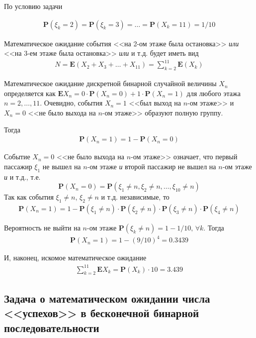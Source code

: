\documentclass[%
	11pt,
	a4paper,
	utf8,
		]{article}
\begin{document}
По условию задачи 

\begin{align*}
	\mathbf{P}(\xi_k = 2) = \mathbf{P}(\xi_k = 3) = \ldots = \mathbf{P}(X_k = 11) = 1/10
\end{align*}

Математическое ожидание события <<на 2-ом этаже была остановка>> \emph{или} <<на 3-ем этаже была остановка>> \emph{или} и т.д. будет иметь вид
\begin{align*}
	N = \mathbf{E} (X_2 + X_3 + \ldots + X_{11}) = \sum_{k=2}^{11} \mathbf{E}(X_k)
\end{align*}

Математическое ожидание дискретной бинарной случайной величины $ X_n $ определяется как $ \mathbf{E}X_n = 0 \cdot \mathbf{P}(X_n = 0) + 1 \cdot \mathbf{P}(X_n = 1) $ для любого этажа $ n = 2, \ldots, 11 $. Очевидно, события $ X_n = 1 $ <<был выход на $ n $-ом этаже>> и $ X_n  = 0 $ <<не было выхода на $ n $-ом этаже>> образуют полную группу.

Тогда
\begin{align*}
	 \mathbf{P}(X_n = 1) = 1 - \mathbf{P}(X_n = 0)
\end{align*}

Событие $ X_n = 0 $ <<не было выхода на $ n $-ом этаже>> означает, что первый пассажир $ \xi_1 $ не вышел на $ n $-ом этаже \emph{и} второй пассажир не вышел на $ n $-ом этаже \emph{и} и т.д., т.е.
$$
\mathbf{P}(X_n = 0) = \mathbf{P}(\xi_1 \neq n, \xi_2 \neq n, \ldots, \xi_{10} \neq n)
$$ 
Так как события $ \xi_1 \neq n $, $ \xi_2 \neq n $ и т.д. независимые, то
\begin{align*}
	\mathbf{P}(X_n = 1) = 1 - \mathbf{P}(\xi_1 \neq n) \cdot \mathbf{P}(\xi_2 \neq n) \cdot \mathbf{P}(\xi_{3} \neq n) \cdot \mathbf{P}(\xi_{4} \neq n)
\end{align*}

Вероятность не выйти на $ n $-ом этаже $ \mathbf{P}(\xi_k \neq n) = 1 - 1 / 10 , \, \forall k$. Тогда
\begin{align*}
	\mathbf{P}(X_n = 1) = 1 - (9 / 10)^{4} = 0.3439
\end{align*}

И, наконец, искомое математическое ожидание
\begin{align*}
	\boxed{\sum_{k=2}^{11} \mathbf{E} X_k = \mathbf{P}(X_k) \cdot 10 = 3.439}
\end{align*}

\subsection{Задача о математическом ожидании числа <<успехов>> в бесконечной бинарной последовательности}
\end{document}
